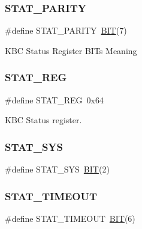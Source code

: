 \hypertarget{group__i8042_ga3a22e3be02ba0180834d3c04c03b2640}{}\label{group__i8042_ga3a22e3be02ba0180834d3c04c03b2640} 
\subsubsection{\texorpdfstring{S\+T\+A\+T\+\_\+\+P\+A\+R\+I\+TY}{STAT\_PARITY}}
{\footnotesize\ttfamily \#define S\+T\+A\+T\+\_\+\+P\+A\+R\+I\+TY~\hyperlink{group___serial_ga3a8ea58898cb58fc96013383d39f482c}{B\+IT}(7)}

K\+BC Status Register B\+I\+Ts\textquotesingle{} Meaning \hypertarget{group__i8042_ga89c4d098b53809674457b1660b1af780}{}\label{group__i8042_ga89c4d098b53809674457b1660b1af780} 
\subsubsection{\texorpdfstring{S\+T\+A\+T\+\_\+\+R\+EG}{STAT\_REG}}
{\footnotesize\ttfamily \#define S\+T\+A\+T\+\_\+\+R\+EG~0x64}



K\+BC Status register. 

\hypertarget{group__i8042_ga4c990a977bc5fce3f9adcc988fb8cfaf}{}\label{group__i8042_ga4c990a977bc5fce3f9adcc988fb8cfaf} 
\subsubsection{\texorpdfstring{S\+T\+A\+T\+\_\+\+S\+YS}{STAT\_SYS}}
{\footnotesize\ttfamily \#define S\+T\+A\+T\+\_\+\+S\+YS~\hyperlink{group___serial_ga3a8ea58898cb58fc96013383d39f482c}{B\+IT}(2)}

\hypertarget{group__i8042_ga0d365c7bae835270c6443e9aa806f503}{}\label{group__i8042_ga0d365c7bae835270c6443e9aa806f503} 
\subsubsection{\texorpdfstring{S\+T\+A\+T\+\_\+\+T\+I\+M\+E\+O\+UT}{STAT\_TIMEOUT}}
{\footnotesize\ttfamily \#define S\+T\+A\+T\+\_\+\+T\+I\+M\+E\+O\+UT~\hyperlink{group___serial_ga3a8ea58898cb58fc96013383d39f482c}{B\+IT}(6)}

